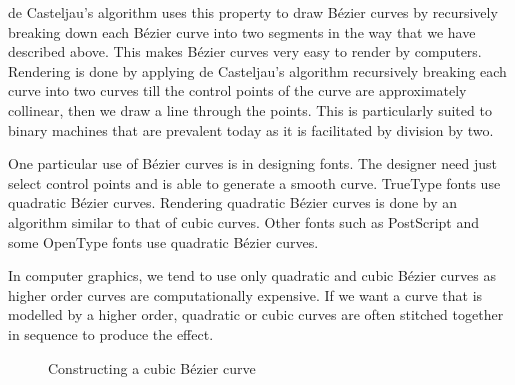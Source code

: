 \documentclass{article}
\begin{document}
de Casteljau's algorithm uses this property to draw B\'ezier curves by recursively breaking down each B\'ezier curve into two segments in the way that we have described above.
This makes B\'ezier curves very easy to render by computers.
Rendering is done by applying de Casteljau's algorithm recursively breaking each curve into two curves till the control points of the curve are approximately collinear, then we draw a line through the points.
This is particularly suited to binary machines that are prevalent today as it is facilitated by division by two.

One particular use of B\'ezier curves is in designing fonts. The designer need just select control points and is able to generate a smooth curve.
TrueType fonts use quadratic B\'ezier curves.
Rendering quadratic B\'ezier curves is done by an algorithm similar to that of cubic curves.
Other fonts such as PostScript and some OpenType fonts use quadratic B\'ezier curves.

In computer graphics, we tend to use only quadratic and cubic B\'ezier curves as higher order curves are computationally expensive.
If we want a curve that is modelled by a higher order, quadratic or cubic curves are often stitched together in sequence to produce the effect.

\begin{figure}
  \centering
  \caption{Constructing a cubic B\'ezier curve}
  \label{fig:bec:3}
\end{figure}
\end{document}
